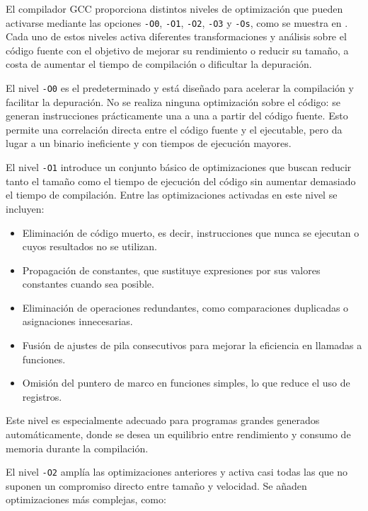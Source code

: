 \documentclass[11pt,a4paper,twoside]{article}
\theoremstyle{definition}
\begin{document}
	El compilador GCC proporciona distintos niveles de optimización que pueden activarse mediante las opciones \texttt{-O0}, \texttt{-O1}, \texttt{-O2}, \texttt{-O3} y \texttt{-Os}, como se muestra en \cite{gcc}. Cada uno de estos niveles activa diferentes transformaciones y análisis sobre el código fuente con el objetivo de mejorar su rendimiento o reducir su tamaño, a costa de aumentar el tiempo de compilación o dificultar la depuración.
	
	El nivel \texttt{-O0} es el predeterminado y está diseñado para acelerar la compilación y facilitar la depuración. No se realiza ninguna optimización sobre el código: se generan instrucciones prácticamente una a una a partir del código fuente. Esto permite una correlación directa entre el código fuente y el ejecutable, pero da lugar a un binario ineficiente y con tiempos de ejecución mayores.
	
	El nivel \texttt{-O1} introduce un conjunto básico de optimizaciones que buscan reducir tanto el tamaño como el tiempo de ejecución del código sin aumentar demasiado el tiempo de compilación. Entre las optimizaciones activadas en este nivel se incluyen:
	
	\begin{itemize}
		\item Eliminación de código muerto, es decir, instrucciones que nunca se ejecutan o cuyos resultados no se utilizan.
		\item Propagación de constantes, que sustituye expresiones por sus valores constantes cuando sea posible.
		\item Eliminación de operaciones redundantes, como comparaciones duplicadas o asignaciones innecesarias.
		\item Fusión de ajustes de pila consecutivos para mejorar la eficiencia en llamadas a funciones.
		\item Omisión del puntero de marco en funciones simples, lo que reduce el uso de registros.
	\end{itemize}

	Este nivel es especialmente adecuado para programas grandes generados automáticamente, donde se desea un equilibrio entre rendimiento y consumo de memoria durante la compilación.
	
	El nivel \texttt{-O2} amplía las optimizaciones anteriores y activa casi todas las que no suponen un compromiso directo entre tamaño y velocidad. Se añaden optimizaciones más complejas, como:
	
\end{document}

